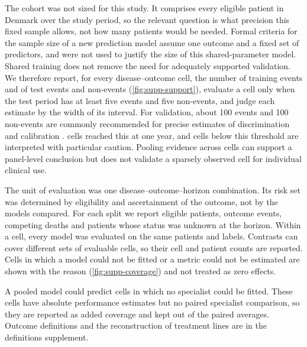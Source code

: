 The cohort was not sized for this study. It comprises every eligible patient in
Denmark over the study period, so the relevant question is what precision this
fixed sample allows, not how many patients would be needed. Formal criteria for
the sample size of a new prediction model \citep{Riley2020} assume one outcome
and a fixed set of predictors, and were not used to justify the size of this shared-parameter model.
Shared training does not remove the need for adequately supported validation. We therefore report, for every
disease--outcome cell, the number of training events and of test events and
non-events (\cref{fig:supp-support}), evaluate a cell only when the test period
has at least five events and five non-events, and judge each estimate by the
width of its interval. For validation, about 100 events and 100 non-events are
commonly recommended for precise estimates of discrimination and calibration
\citep{collins2016validation}.  cells reached this at one year,
and cells below this threshold are interpreted with particular caution.
Pooling evidence across cells can support a panel-level conclusion but does not
validate a sparsely observed cell for individual clinical use.

The unit of evaluation was one disease--outcome--horizon combination. Its risk
set was determined by eligibility and ascertainment of the outcome, not by the
models compared. For each split we report eligible patients, outcome events,
competing deaths and patients whose status was unknown at the horizon. Within a
cell, every model was evaluated on the same patients and labels. Contrasts can
cover different sets of evaluable cells, so their cell and patient counts are
reported. Cells in which a model could not be fitted or a metric could not be
estimated are shown with the reason (\cref{fig:supp-coverage}) and not treated
as zero effects.

A pooled model could predict cells in which no specialist could be fitted.
These cells have absolute performance estimates but no paired specialist
comparison, so they are reported as added coverage and kept out of the paired
averages. Outcome definitions and the reconstruction of treatment lines are in
the definitions supplement.

